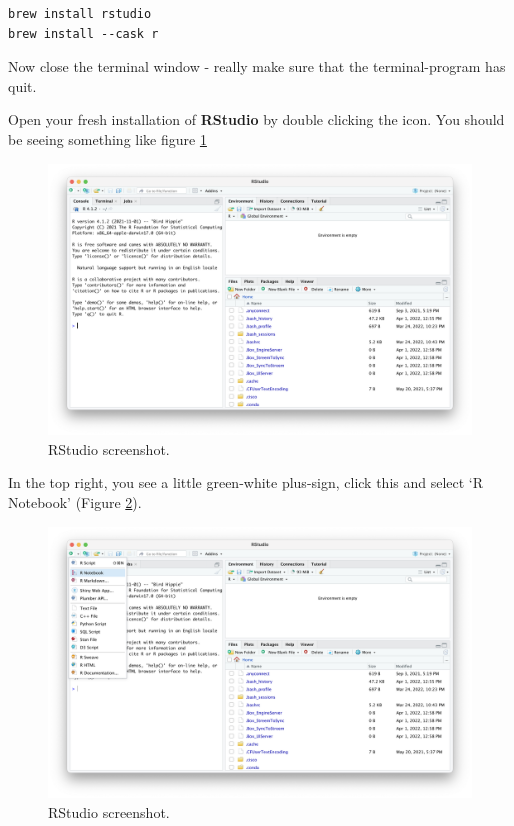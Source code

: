 \documentclass[
]{book}
\begin{document}
\begin{lstlisting}
brew install rstudio
brew install --cask r
\end{lstlisting}

Now close the terminal window - really make sure that the terminal-program has quit.

Open your fresh installation of \textbf{RStudio} by double clicking the icon. You should be seeing something like figure \ref{fig:rstudio-screenshot}

\begin{figure}[H]

{\centering \includegraphics[width=34.5in]{img/rstudio-screenshot} 

}

\caption{RStudio screenshot.}\label{fig:rstudio-screenshot}
\end{figure}

In the top right, you see a little green-white plus-sign, click this and select `R Notebook' (Figure \ref{fig:rstudio-screenshot-create-notebook}).

\begin{figure}[H]

{\centering \includegraphics[width=34.5in]{img/rstudio-screenshot-create-notebook} 

}

\caption{RStudio screenshot.}\label{fig:rstudio-screenshot-create-notebook}
\end{figure}
\end{document}
